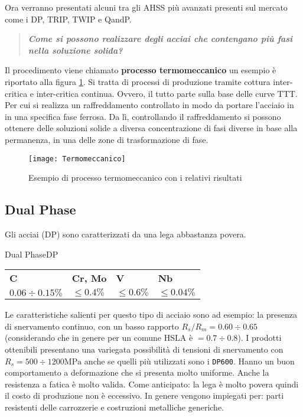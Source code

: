 Ora verranno presentati alcuni tra gli \ac{AHSS} più avanzati presenti sul mercato come i
\ac{DP}, \ac{TRIP}, \ac{TWIP} e \ac{QandP}.

\begin{quote}
\emph{\textbf{Come si possono realizzare degli acciai che contengano più fasi 
nella soluzione solida?}}
\end{quote}

Il procedimento viene chiamato \textbf{processo termomeccanico} un esempio è riportato alla
figura \ref{fig:Termomeccanico}.
Si tratta di processi di produzione tramite cottura inter-critica e inter-critica continua.
Ovvero, il tutto parte sulla base delle curve \ac{TTT}. Per cui si realizza un raffreddamento 
controllato in modo da portare l'acciaio in in una specifica fase ferrosa.
Da lì, controllando il raffreddamento si possono ottenere delle soluzioni solide a 
diversa concentrazione di fasi diverse in base alla permanenza, in
una delle zone di trasformazione di fase. 

\begin{figure}
\centering
\texttt{[image: Termomeccanico]}
\caption{Esempio di processo termomeccanico con i relativi risultati}
\label{fig:Termomeccanico}
\end{figure}

\subsection{Dual Phase}
Gli acciai  (\ac{DP}) sono caratterizzati da una lega abbastanza povera.

\begin{definition}{Dual Phase}{DP}
\\
\begin{tabularx}{\textwidth}{X|X|X|X}
\toprule
\textbf{C} & \textbf{Cr, Mo} & \textbf{V} & \textbf{Nb}\\
$0.06\div 0.15\%$ & $\leq 0.4\%$ & $\leq 0.6\%$ & $\leq 0.04\%$\\
\bottomrule
\end{tabularx}
\end{definition}
Le caratteristiche salienti per questo tipo di acciaio sono ad esempio:
la presenza di snervamento continuo, con un basso rapporto $R_s/R_m = 0.60\div 0.65$ 
(considerando che in genere per un comune \ac{HSLA} è $= 0.7\div 0.8$).
I prodotti ottenibili presentano una variegata possibilità di tensioni di snervamento
con $R_s = 500 \div 1200\unit{\MPa}$ anche se quelli più utilizzati sono i \texttt{DP600}.
Hanno un buon comportamento a deformazione che si presenta molto uniforme. Anche la resistenza a
fatica è molto valida. Come anticipato: la lega è molto povera quindi il costo di produzione non
è eccessivo.
In genere vengono impiegati per: parti resistenti delle carrozzerie e costruzioni metalliche 
generiche.


